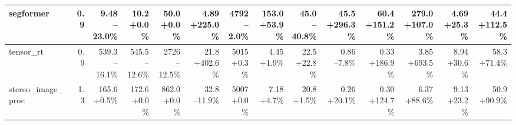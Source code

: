 \begin{table}[t]
{\begin{tabular}{lrrrrrrrrrrrrr}
\midrule
segformer & 0.9 & \makecell[r]{9.48\\--23.0\%} & \makecell[r]{10.2\\+0.0\%} & \makecell[r]{50.0\\+0.0\%} & \makecell[r]{4.89\\+225.0\%} & \makecell[r]{4792\\--2.0\%} & \makecell[r]{153.0\\+53.9\%} & \makecell[r]{45.0\\--40.8\%} & \makecell[r]{45.5\\+296.3\%} & \makecell[r]{60.4\\+151.2\%} & \makecell[r]{279.0\\+107.0\%} & \makecell[r]{4.69\\+25.3\%} & \makecell[r]{44.4\\+112.5\%} \\
\midrule
tensor\_rt & 0.9 & \makecell[r]{539.3\\--16.1\%} & \makecell[r]{545.5\\--12.6\%} & \makecell[r]{2726\\--12.5\%} & \makecell[r]{21.8\\+402.6\%} & \makecell[r]{5015\\+0.3\%} & \makecell[r]{4.45\\+1.9\%} & \makecell[r]{22.5\\+22.8\%} & \makecell[r]{0.86\\--7.8\%} & \makecell[r]{0.33\\+186.9\%} & \makecell[r]{3.85\\+693.5\%} & \makecell[r]{8.94\\+30.6\%} & \makecell[r]{58.3\\+71.4\%} \\
\midrule
stereo\_image\_proc & 1.3 & \makecell[r]{165.6\\+0.5\%} & \makecell[r]{172.6\\+0.0\%} & \makecell[r]{862.0\\+0.0\%} & \makecell[r]{32.8\\--11.9\%} & \makecell[r]{5007\\+0.0\%} & \makecell[r]{7.18\\+4.7\%} & \makecell[r]{20.8\\+1.5\%} & \makecell[r]{0.26\\+20.1\%} & \makecell[r]{0.30\\+124.7\%} & \makecell[r]{6.37\\+88.6\%} & \makecell[r]{9.13\\+23.2\%} & \makecell[r]{50.9\\+90.9\%} \\

\end{tabular}}
\end{table}
